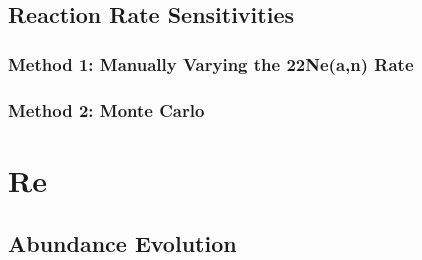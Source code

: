 
\subsection{Reaction Rate Sensitivities}

\subsubsection{Method 1: Manually Varying the 22Ne(a,n) Rate}

\subsubsection{Method 2: Monte Carlo}



\section{Re}

\subsection{Abundance Evolution}

